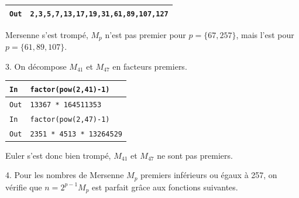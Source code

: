 \documentclass[titlepage]{article}
\begin{document}
    

    \begin{tabularx}{12cm}{|p{0.60cm}|X|}
        \hline
        \texttt{Out}
        &
        \texttt{2,3,5,7,13,17,19,31,61,89,107,127}
        \\
        \hline
    \end{tabularx}
    \bigbreak

    Mersenne s'est trompé, $M_p$ n'est pas premier pour $p = \{67, 257\}$, mais l'est pour $p = \{61, 89, 107\}$.\bigbreak

    3. On décompose $M_{41}$ et $M_{47}$ en facteurs premiers.\bigbreak

    \begin{tabularx}{12cm}{|p{0.60cm}|X|}
        \hline
        \rowcolor{gray}
        \texttt{In}
        & 
        \texttt{factor(pow(2,41)-1)}
        \\
        \hline
        \texttt{Out}
        &
        \texttt{13367 * 164511353}
        \\
        \hline
        \rowcolor{gray}
        \texttt{In}
        & 
        \texttt{factor(pow(2,47)-1)}
        \\
        \hline
        \texttt{Out}
        &
        \texttt{2351 * 4513 * 13264529}
        \\
        \hline
    \end{tabularx}
    \bigbreak

    Euler s'est donc bien trompé, $M_{41}$ et $M_{47}$ ne sont pas premiers.\bigbreak

    4. Pour les nombres de Mersenne $M_p$ premiers inférieurs ou égaux à 257, on vérifie que $n = 2^{p-1}M_p$ est parfait grâce aux fonctions suivantes.
    
\end{document}
